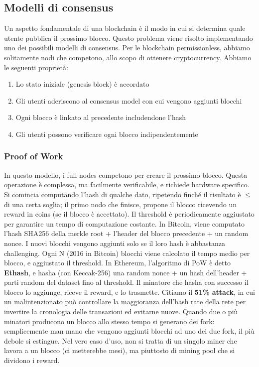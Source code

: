 \documentclass[11pt]{article}
\begin{document}
\subsection{Modelli di consensus} Un aspetto fondamentale di una blockchain è il modo in cui si determina quale utente pubblica il prossimo blocco. Questo problema viene risolto implementando uno dei possibili modelli di consensus. Per le blockchain permissionless, abbiamo solitamente nodi che competono, allo scopo di ottenere cryptocurrency. Abbiamo le seguenti proprietà:
\begin{enumerate}
    \item Lo stato iniziale (genesis block) è accordato
    \item Gli utenti aderiscono al consensus model con cui vengono aggiunti blocchi 
    \item Ogni blocco è linkato al precedente includendone l'hash  
    \item Gli utenti possono verificare ogni blocco indipendentemente
\end{enumerate}
\subsubsection{Proof of Work} In questo modello, i full nodes competono per creare il prossimo blocco. Questa operazione è complessa, ma facilmente verificabile, e richiede hardware specifico. Si comincia computando l'hash di qualche dato, ripetendo finché il risultato è $\leq$ di una certa soglia; il primo nodo che finisce, propone il blocco ricevendo un reward in coins (se il blocco è accettato). Il threshold è periodicamente aggiustato per garantire un tempo di computazione costante. In Bitcoin, viene computato l'hash SHA256 della merkle root + l'header del blocco precedente + un random nonce. I nuovi blocchi vengono aggiunti solo se il loro hash è abbastanza challenging. Ogni N (2016 in Bitcoin) blocchi viene calcolato il tempo medio per blocco, e aggiustato il threshold. In Ethereum, l'algoritmo di PoW è detto \textbf{Ethash}, e hasha (con Keccak-256) una random nonce + un hash dell'header + parti random del dataset fino al threshold. Il minatore che hasha con successo il blocco lo aggiunge, riceve il reward, e lo trasmette.  Citiamo il \textbf{51\% attack}, in cui un malintenzionato può controllare la maggioranza dell'hash rate della rete per invertire la cronologia delle transazioni ed evitarne nuove. Quando due o più minatori producono un blocco allo stesso tempo si generano dei fork: semplicemente man mano che vengono aggiunti blocchi ad uno dei due fork, il più debole si estingue. Nel vero caso d'uso, non si tratta di un singolo miner che lavora a un blocco (ci metterebbe mesi), ma piuttosto di mining pool che si dividono i reward. 
\end{document}
